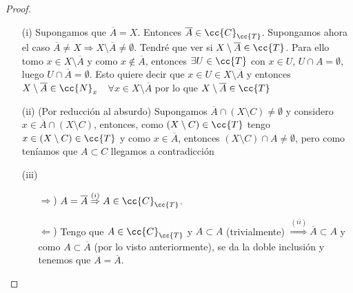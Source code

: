 \begin{prop}
    \begin{proof}\
        \begin{enumerate}
            \item[(i)] Supongamos que $\overline{A}=X$. Entonces $\overline{A}\in \cc{C}_{\cc{T}}$. Supongamos ahora el caso $\overline{A}\neq X\Rightarrow X\setminus \overline{A} \neq \emptyset$. Tendré que ver si $X\setminus \overline{A}\in \cc{T}$. Para ello tomo $x \in X\setminus \overline{A}$ y como $x\notin \overline{A}$, entonces $\exists U \in \cc{T}$ con $x\in U$, $U\cap A=\emptyset$, luego $U\cap \overline{A}=\emptyset$. Esto quiere decir que $x \in U\in X\setminus \overline{A}$ y entonces $X\setminus \overline{A} \in \cc{N}_x$\ \ $\forall x \in X\setminus \overline{A}$ por lo que $X\setminus \overline{A}\in \cc{T}$
            \item[(ii)] (Por reducción al absurdo) Supongamos $\overline{A}\cap (X\setminus C) \neq \emptyset$ y considero $x \in \overline{A}\cap (X\setminus C)$, entonces, como $(X\setminus C) \in \cc{T}$ tengo $x\in (X\setminus C) \in \cc{T}$ y como $x\in \overline{A}$, entonces $(X\setminus C)\cap A \neq \emptyset$, pero como teníamos que $A\subset C$ llegamos a contradicción
            \item[(iii)]
            \begin{itemize}
                \item[$\Rightarrow$)] $A=\overline{A} \overset{(i)}{\Rightarrow} A\in \cc{C}_{\cc{T}}$.
                \item[$\Leftarrow$)] Tengo que $A\in \cc{C}_{\cc{T}}$ y $A\subset A$ (trivialmente) $\overset{(ii)}{\Rightarrow} \overline{A}\subset A$ y como $A\subset \overline{A}$ (por lo visto anteriormente), se da la doble inclusión y tenemos que $A=\overline{A}$.
            \end{itemize} 
        \end{enumerate}
    \end{proof}
\end{prop}

